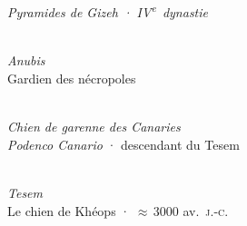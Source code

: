 \vspace*{\fill}

\noindent{}\\[0.2em]
{\centering\figcaptionname\itshape Pyramides de Gizeh · \textup{IV}\textsuperscript{e}~dynastie\par}

\vspace{\baselineskip}

\noindent
\begin{minipage}[t]{0.350\textwidth}
  \begin{flushleft}
    \\[0.3em]
    {\figcaptionname\itshape Anubis}\\[-6pt]
    {\figcaptiondetail Gardien des nécropoles}
  \end{flushleft}
\end{minipage}
\hfill
\begin{minipage}[t]{0.620\textwidth}
  \begin{flushright}
    \\[0.3em]
    {\figcaptionname\itshape Chien de garenne des Canaries}\\[-6pt]
    {\figcaptiondetail\textit{Podenco Canario} · descendant du Tesem}
  \end{flushright}
\end{minipage}

\vspace{\baselineskip}

\begin{center}
  \\[0.3em]
  {\figcaptionname\itshape Tesem}\\[-6pt]
  {\figcaptiondetail Le chien de Khéops · \textup{$\approx$\,3000 av.~\textsc{j.-c.}}}
\end{center}

\vspace*{\fill}
